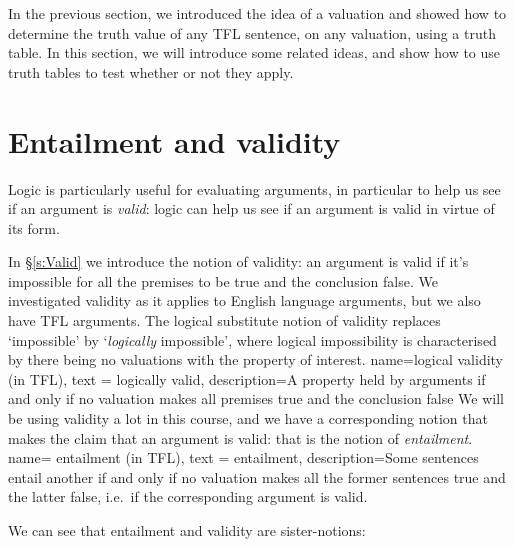 In the previous section, we introduced the idea of a valuation and showed how to determine the truth value of any TFL sentence, on any valuation, using a truth table. In this section, we will introduce some related ideas, and show how to use truth tables to test whether or not they apply.

\section{Entailment and validity}
Logic is particularly useful for evaluating arguments, in particular to help us see if an argument is \emph{valid}: logic can help us see if an argument is valid in virtue of its form. 

In \S\ref{s:Valid} we introduce the notion of validity: an argument is valid if it's impossible for all the premises to be true and the conclusion false. We investigated validity as it applies to English language arguments, but we also have TFL arguments. The logical substitute notion of validity replaces `impossible' by `\emph{logically} impossible', where logical impossibility is characterised by there being no valuations with the property of interest. 
{
	name=logical validity (in TFL),
	text = logically valid,
	description={A property held by arguments if and only if no \gls{valuation} makes all premises true and the conclusion false}
}
We will be using validity a lot in this course, and we have a corresponding notion that makes the claim that an argument is valid: that is the notion of \emph{entailment}. 
{
	name= entailment (in TFL),
	text = entailment,
	description={Some sentences entail another if and only if no \gls{valuation} makes all the former sentences true and the latter false, i.e.~if the corresponding argument is valid.}
}

We can see that entailment and validity are sister-notions: 

